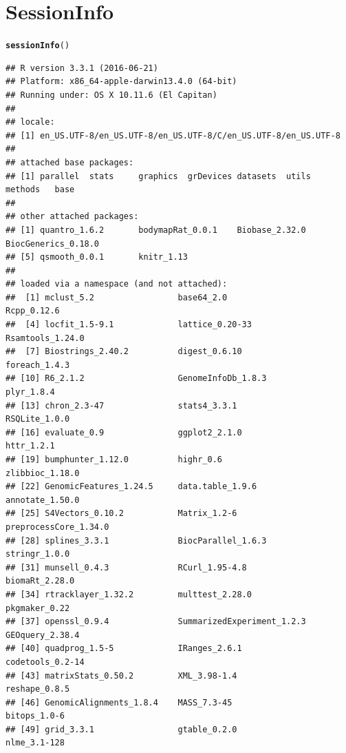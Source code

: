 \documentclass{article}\usepackage[]{graphicx}\usepackage[usenames,dvipsnames]{color}
\makeatletter
\newcommand{\hlstd}[1]{\textcolor[rgb]{0.345,0.345,0.345}{#1}}%
\newcommand{\hlkwd}[1]{\textcolor[rgb]{0.737,0.353,0.396}{\textbf{#1}}}%
\newenvironment{kframe}{%
 \def\at@end@of@kframe{}%
 \ifinner\ifhmode%
  \def\at@end@of@kframe{\end{minipage}}%
  \begin{minipage}{\columnwidth}%
 \fi\fi%
 \def\FrameCommand##1{\hskip\@totalleftmargin \hskip-\fboxsep
 \colorbox{shadecolor}{##1}\hskip-\fboxsep
     \hskip-\linewidth \hskip-\@totalleftmargin \hskip\columnwidth}%
 \MakeFramed {\advance\hsize-\width
   \@totalleftmargin\z@ \linewidth\hsize
   \@setminipage}}%
 {\par\unskip\endMakeFramed%
 \at@end@of@kframe}
\newenvironment{knitrout}{}{} %
\makeatother
\begin{document}
\section{SessionInfo}

\begin{knitrout}
\color{fgcolor}\begin{kframe}
\begin{alltt}
\hlkwd{sessionInfo}\hlstd{()}
\end{alltt}
\begin{verbatim}
## R version 3.3.1 (2016-06-21)
## Platform: x86_64-apple-darwin13.4.0 (64-bit)
## Running under: OS X 10.11.6 (El Capitan)
## 
## locale:
## [1] en_US.UTF-8/en_US.UTF-8/en_US.UTF-8/C/en_US.UTF-8/en_US.UTF-8
## 
## attached base packages:
## [1] parallel  stats     graphics  grDevices datasets  utils     methods   base     
## 
## other attached packages:
## [1] quantro_1.6.2       bodymapRat_0.0.1    Biobase_2.32.0      BiocGenerics_0.18.0
## [5] qsmooth_0.0.1       knitr_1.13         
## 
## loaded via a namespace (and not attached):
##  [1] mclust_5.2                 base64_2.0                 Rcpp_0.12.6               
##  [4] locfit_1.5-9.1             lattice_0.20-33            Rsamtools_1.24.0          
##  [7] Biostrings_2.40.2          digest_0.6.10              foreach_1.4.3             
## [10] R6_2.1.2                   GenomeInfoDb_1.8.3         plyr_1.8.4                
## [13] chron_2.3-47               stats4_3.3.1               RSQLite_1.0.0             
## [16] evaluate_0.9               ggplot2_2.1.0              httr_1.2.1                
## [19] bumphunter_1.12.0          highr_0.6                  zlibbioc_1.18.0           
## [22] GenomicFeatures_1.24.5     data.table_1.9.6           annotate_1.50.0           
## [25] S4Vectors_0.10.2           Matrix_1.2-6               preprocessCore_1.34.0     
## [28] splines_3.3.1              BiocParallel_1.6.3         stringr_1.0.0             
## [31] munsell_0.4.3              RCurl_1.95-4.8             biomaRt_2.28.0            
## [34] rtracklayer_1.32.2         multtest_2.28.0            pkgmaker_0.22             
## [37] openssl_0.9.4              SummarizedExperiment_1.2.3 GEOquery_2.38.4           
## [40] quadprog_1.5-5             IRanges_2.6.1              codetools_0.2-14          
## [43] matrixStats_0.50.2         XML_3.98-1.4               reshape_0.8.5             
## [46] GenomicAlignments_1.8.4    MASS_7.3-45                bitops_1.0-6              
## [49] grid_3.3.1                 gtable_0.2.0               nlme_3.1-128              

\end{verbatim}
\end{kframe}
\end{knitrout}
\end{document}
